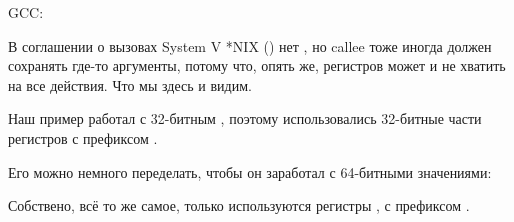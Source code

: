 \NonOptimizing GCC:



В соглашении о вызовах System V *NIX (\SysVABI) нет , но \gls{callee} тоже иногда
должен сохранять где-то аргументы, потому что, опять же, регистров может и не хватить на все действия.
Что мы здесь и видим.


Наш пример работал с 32-битным \Tint, поэтому использовались 32-битные части регистров с префиксом .

Его можно немного переделать, чтобы он заработал с 64-битными значениями:





Собствено, всё то же самое, только используются регистры , с префиксом .

